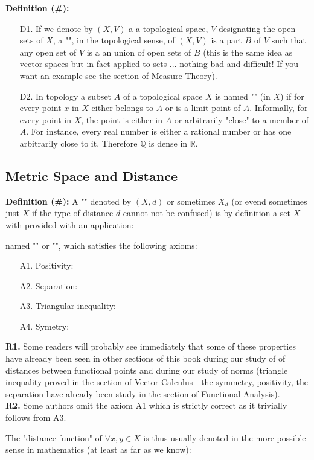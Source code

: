 	\textbf{Definition (\#\mydef):} 
	\begin{enumerate}
		\item[D1.] If we denote by $(X, V)$ a a topological space, $V$ designating the open sets of $X$, a "", in the topological sense, of $(X, V)$ is a part $B$ of $V$ such that any open set of $V$ is a an union of open sets of $B$ (this is the same idea as vector spaces but in fact applied to sets ... nothing bad and difficult! If you want an example see the section of Measure Theory).
		
		\item[D2.] In topology a subset $A$ of a topological space $X$ is named "" (in $X$) if for every point $x$ in $X$ either belongs to $A$ or is a limit point of $A$. Informally, for every point in $X$, the point is either in $A$ or arbitrarily "close" to a member of $A$. For instance, every real number is either a rational number or has one arbitrarily close to it. Therefore $\mathbb{Q}$ is dense in $\mathbb{R}$.
	\end{enumerate}
	
	\subsection{Metric Space and Distance}
	\textbf{Definition (\#\mydef):} A "" denoted by $(X, d)$ or sometimes $X_d$ (or evend sometimes just $X$ if the type of distance $d$ cannot not be confused) is by definition a set $X$ with provided with an application:
	
	named "" or "", which satisfies the following axioms:
	\begin{itemize}
		\item[A1.] Positivity:
		
		
		\item[A2.] Separation:
		
		\item[A3.] Triangular inequality:
		
		
		\item[A4.] Symetry: 
		
	\end{itemize}
	\begin{tcolorbox}[title=Remarks,colframe=black,arc=10pt]
		\textbf{R1.} Some readers will probably see immediately that some of these properties have already been seen in other sections of this book during our study of of distances between functional points and during our study of norms (triangle inequality proved in the section of Vector Calculus - the symmetry, positivity, the separation have already been study in the section of Functional Analysis).\\
		
		\textbf{R2.} Some authors omit the axiom A1 which is strictly correct as it trivially follows from A3.\\
	\end{tcolorbox}
	The "distance function" of $\forall x,y \in X$ is thus usually denoted in the more possible sense in mathematics (at least as far as we know):
	
